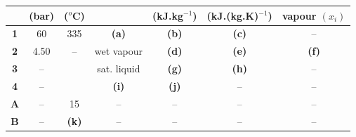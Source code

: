 \documentclass[calculator,fluidstables,datasheet,sample]{exam}
\begin{document}
\begin{question}
\begin{center}
\begin{tabular} {||c | c c c c c c || }
            & {\bf (bar)}& {\bf ($^{o}$C)} &               & {\bf (kJ.kg$^{-1}$)} & {\bf (kJ.(kg.K)$^{-1}$)} &  {\bf vapour $\left(x_{i}\right)$} \\
\hline\hline
 {\bf 1 }   & 60         & 335            &   {\bf (a)}    & {\bf (b)}           & {\bf (c)}               &   --          \\
 {\bf 2 }   & 4.50       &  --            &   wet vapour   & {\bf (d)}           & {\bf (e)}               &   {\bf (f)}    \\
 {\bf 3 }   & --         &                &   sat. liquid  & {\bf (g)}           & {\bf (h)}               &   --            \\
 {\bf 4 }   & --         &                &   {\bf (i)}    & {\bf (j)}           & --                      &   --            \\
 {\bf A }   & --         & 15             &   --           & --                  & --                      &   --     \\
 {\bf B }   & --         & {\bf (k)}      &   --           & --                  & --                      &   --         \\
 \hline\hline
\end{tabular}
\end{center}
%
\end{question}
\clearpage
\end{document}
